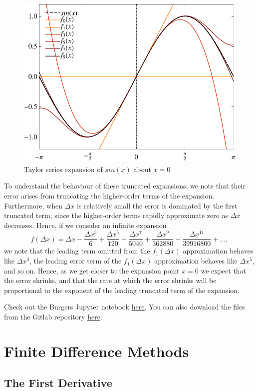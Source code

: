 \begin{figure}[htbp]
	\centering
	\includegraphics[width=0.6\linewidth]{Pictures/taylor_series_sin}
	\caption{Taylor series expansion of $sin(x)$ about $x=0$}
	\label{fig:taylor_series}
\end{figure}

To understand the behaviour of these truncated expansions, we note that their error arises from truncating the higher-order terms of the expansion. Furthermore, when $\Delta x$ is relatively small the error is dominated by the first truncated term, since the higher-order terms rapidly approximate zero as $\Delta x$ decreases. Hence, if we consider an infinite expansion
\begin{equation}
	f(\Delta x) = \Delta x - \frac{\Delta x^3}{6} + \frac{\Delta x^5}{120} - \frac{\Delta x^7}{5040} + \frac{\Delta x^9}{362880} - \frac{\Delta x^{11}}{39916800} + \hdots,
\end{equation}
we note that the leading term omitted from the $f_1(\Delta x)$ approximation behaves like $\Delta x^3$, the leading error term of the $f_1(\Delta x)$ approximation behaves like $\Delta x^5$, and so on. Hence, as we get closer to the expansion point $x=0$ we expect that the error shrinks, and that the rate at which the error shrinks will be proportional to the exponent of the leading truncated term of the expansion.
\begin{jupyternote}
	Check out the Burgers Jupyter notebook \href{\binderurl}{\underline{here}}. You can also download the files from the Gitlab repository \href{\repourl}{\underline{here}}.
\end{jupyternote}
\chapter{Finite Difference Methods}
\section{The First Derivative}

